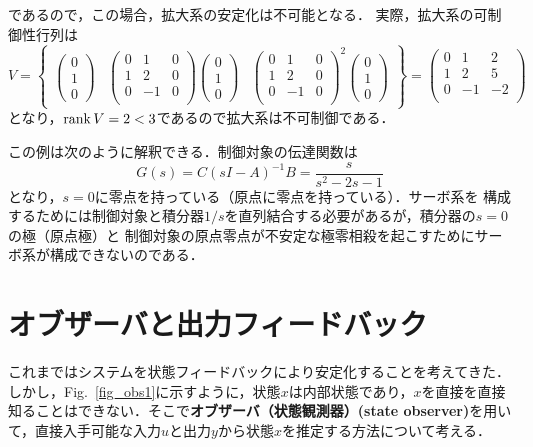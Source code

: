 であるので，この場合，拡大系の安定化は不可能となる．
実際，拡大系の可制御性行列は
\[
 V = 
 \left\{
 \begin{array}{ccc}
 \left(
 \begin{array}{c}
  0 \\
  1 \\
  0
 \end{array}
 \right) &
 \left(
 \begin{array}{ccc}
  0 & 1 & 0 \\
  1 & 2 & 0 \\
  0 & -1 & 0 \\
 \end{array}
 \right)
 \left(
 \begin{array}{c}
  0 \\
  1 \\
  0
 \end{array}
 \right) &
 \left(
 \begin{array}{ccc}
  0 & 1 & 0 \\
  1 & 2 & 0 \\
  0 & -1 & 0 \\
 \end{array}
 \right)^2
 \left(
 \begin{array}{c}
  0 \\
  1 \\
  0
 \end{array}
 \right)
 \end{array}
 \right\} =
 \left(
 \begin{array}{ccc}
  0 & 1 & 2 \\
  1 & 2 & 5 \\
  0 & -1 & -2 \\
 \end{array}
 \right)
\]
となり，$\mathop{\rm rank}\nolimits V = 2<3$であるので拡大系は不可制御である．

この例は次のように解釈できる．制御対象の伝達関数は
\[
 G(s) = C(sI-A)^{-1}B = \frac{s}{s^2-2s-1}
\]
となり，$s=0$に零点を持っている（原点に零点を持っている）．サーボ系を
構成するためには制御対象と積分器$1/s$を直列結合する必要があるが，積分器の$s=0$の極（原点極）と
制御対象の原点零点が不安定な極零相殺を起こすためにサーボ系が構成できないのである．


\section{オブザーバと出力フィードバック}
これまではシステムを状態フィードバックにより安定化することを考えてきた．
しかし，Fig.~\ref{fig_obs1}に示すように，状態$x$は内部状態であり，$x$を直接を直接知ることはできない．そこで{\bf オブザーバ（状態観測器）(state observer)}を用いて，直接入手可能な入力$u$と出力$y$から状態$x$を推定する方法について考える．

